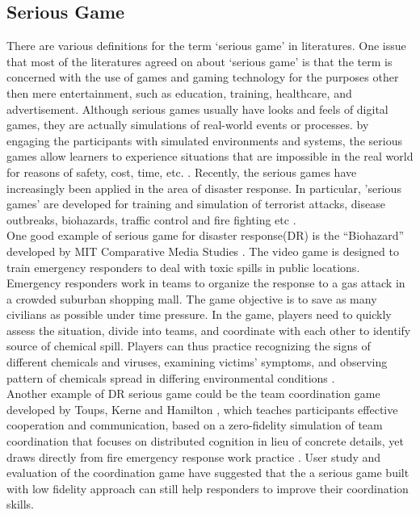 \subsection{Serious Game}
There are various definitions for the term `serious game' in literatures. One issue that most of the literatures agreed on about `serious game' is that the term is concerned with the use of games and gaming technology for the purposes other then mere entertainment, such as education, training, healthcare, and advertisement.\cite{Susi2007} Although serious games usually have looks and feels of digital games, they are actually simulations of real-world events or processes. by engaging the participants with simulated environments and systems, the serious games allow learners to experience situations that are impossible in the real world for reasons of safety, cost, time, etc. \cite{Squire2003,Meesters2013}. Recently, the serious games have increasingly been applied in the area of disaster response. In particular, 'serious games' are developed for training and simulation of terrorist attacks, disease outbreaks, biohazards, traffic control and fire fighting etc \cite{Susi2007,Squire2003}. \\

One good example of serious game for disaster response(DR) is the ``Biohazard'' developed by MIT Comparative Media Studies \cite{Squire2003}. The video game is designed to train emergency responders to deal with toxic spills in public locations. Emergency responders work in teams to organize the response to a gas attack in a crowded suburban shopping mall. The game objective is to save as many civilians as possible under time pressure. In the game,  players need to quickly assess the situation, divide into teams, and coordinate with each other to identify source of chemical spill. Players can thus practice recognizing the signs of different chemicals and viruses, examining victims' symptoms, and observing pattern of chemicals spread in differing environmental conditions \cite{Susi2007}.\\


Another example of DR serious game could be the team coordination game developed by Toups, Kerne and Hamilton \cite{Toups2011}, which teaches participants effective cooperation and communication, based on a zero-fidelity simulation of team coordination that focuses on distributed cognition in lieu of concrete details, yet draws directly from fire emergency response work practice \cite{Toups2011}. User study and evaluation of the coordination game have suggested that the a serious game built with low fidelity approach can still help responders to improve their coordination skills.\\

